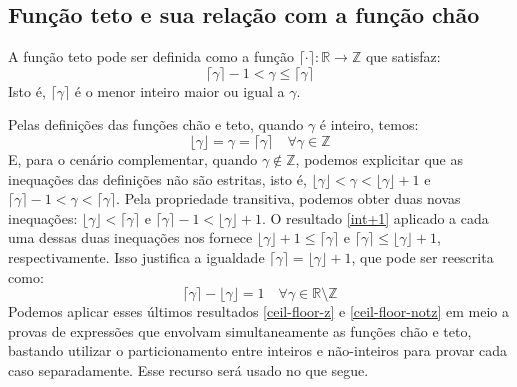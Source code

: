\subsection*{Função teto e sua relação com a função chão}

A função teto pode ser definida
como a função $\lceil \cdot \rceil : \mathds{R} \to \mathds{Z}$
que satisfaz:
\begin{equation}\tag{Teto}
  \lceil \gamma \rceil - 1 < \gamma \le \lceil \gamma \rceil
\end{equation}
Isto é,
$\lceil \gamma \rceil$ é o menor inteiro maior ou igual a $\gamma$.

Pelas definições das funções chão e teto,
quando $\gamma$ é inteiro, temos:
\begin{equation}\label{ceil-floor-z}
  \lfloor \gamma \rfloor = \gamma = \lceil \gamma \rceil
  \quad \forall \gamma \in \mathds{Z}
\end{equation}
E, para o cenário complementar, quando $\gamma \notin \mathds{Z}$,
podemos explicitar que as inequações das definições não são estritas,
isto é, $\lfloor \gamma \rfloor < \gamma < \lfloor \gamma \rfloor + 1$
e $\lceil \gamma \rceil - 1 < \gamma < \lceil \gamma \rceil$.
Pela propriedade transitiva, podemos obter duas novas inequações:
$\lfloor \gamma \rfloor < \lceil \gamma \rceil$
e $\lceil \gamma \rceil - 1 < \lfloor \gamma \rfloor + 1$.
O resultado \eqref{int+1}
aplicado a cada uma dessas duas inequações nos fornece
$\lfloor \gamma \rfloor + 1 \le \lceil \gamma \rceil$ e
$\lceil \gamma \rceil \le \lfloor \gamma \rfloor + 1$, respectivamente.
Isso justifica a igualdade
$\lceil \gamma \rceil = \lfloor \gamma \rfloor + 1$,
que pode ser reescrita como:
\begin{equation}\label{ceil-floor-notz}
  \lceil \gamma \rceil - \lfloor \gamma \rfloor = 1
  \quad \forall \gamma \in \mathds{R} \setminus \mathds{Z}
\end{equation}
Podemos aplicar esses últimos resultados
\eqref{ceil-floor-z} e \eqref{ceil-floor-notz}
em meio a provas de expressões
que envolvam  simultaneamente as funções chão e teto,
bastando utilizar o particionamento entre inteiros e não-inteiros
para provar cada caso separadamente.
Esse recurso será usado no que segue.

